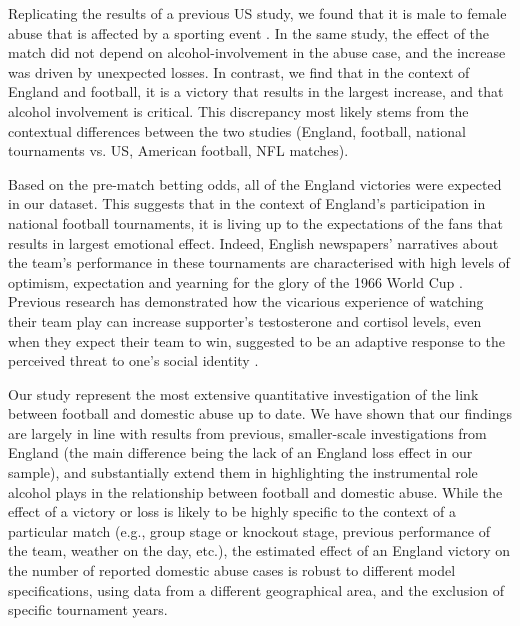 \documentclass[12pt, a4paper]{article}
\begin{document}
 Replicating the results of a previous US study, we found that it is male to female abuse that is affected by a sporting event \citep{Card2011}. In the same study, the effect of the match did not depend on alcohol-involvement in the abuse case, and the increase was driven by unexpected losses. In contrast, we find that in the context of England and football, it is a victory that results in the largest increase, and that alcohol involvement is critical. This discrepancy most likely stems from the contextual differences between the two studies (England, football, national tournaments vs. US, American football, NFL matches). 


Based on the pre-match betting odds, all of the England victories were expected in our dataset. This suggests that in the context of England's participation in national football tournaments, it is living up to the expectations of the fans that results in largest emotional effect. Indeed, English newspapers' narratives about the team's performance in these tournaments are characterised with high levels of optimism, expectation and yearning for the glory of the 1966 World Cup \citep{Vincent2010}. Previous research has demonstrated how the vicarious experience of watching their team play can increase supporter's testosterone and cortisol levels, even when they expect their team to win, suggested to be an adaptive response to the perceived threat to one's social identity \citep{VanderMeij2012}. 

 Our study represent the most extensive quantitative investigation of the link between football and domestic abuse up to date. We have shown that our findings are largely in line with results from previous, smaller-scale investigations from England (the main difference being the lack of an England loss effect in our sample), and substantially extend them in highlighting the instrumental role alcohol plays in the relationship between football and domestic abuse. While the effect of a victory or loss is likely to be highly specific to the context of a particular match (e.g., group stage or knockout stage, previous performance of the team, weather on the day, etc.), the estimated effect of an England victory on the number of reported domestic abuse cases is robust to different model specifications, using data from a different geographical area, and the exclusion of specific tournament years. 
\end{document}
